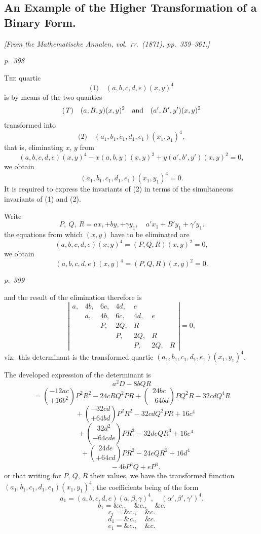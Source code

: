 \documentclass[11pt,a4paper]{article}
\theoremstyle{plain}
\theoremstyle{definition}
\begin{document}
\subsection{An Example of the Higher Transformation of a Binary Form.}

\begin{center}
\textit{[From the Mathematische Annalen, vol.~\textsc{iv}.\ (1871), pp.~359--361.]}
\end{center}

\textit{p.~398}

\noindent
\textsc{The} quartic
\[
\text{(1)}\quad (a, b, c, d, e)(x, y)^4
\]
is by means of the two quantics
\[
\text{(\textit{T})}\quad (a, B, y)(x, y)^2 \quad \text{and} \quad (a', B', y')(x, y)^2
\]
transformed into
\[
\text{(2)}\quad (a_1, b_1, c_1, d_1, e_1)(x_1, y_1)^4,
\]
that is, eliminating $x$, $y$ from
\[
(a, b, c, d, e)(x, y)^4
- x(a, b, y)(x, y)^2 + y(a', b', y')(x, y)^2 = 0,
\]
we obtain
\[
(a_1, b_1, c_1, d_1, e_1)(x_1, y_1)^4 = 0.
\]
It is required to express the invariants of (2) in terms of the simultaneous invariants
of (1) and (2).

Write
\[
P,\ Q,\ R = ax, + by, + \gamma y_1, \quad a'x_1 + B' y_1 + \gamma' y_1.
\]
the equations from which $(x, y)$ have to be eliminated are
\[
(a, b, c, d, e)(x, y)^4 = (P, Q, R)(x, y)^2 = 0,
\]
we obtain
\[
(a, b, c, d, e)(x, y)^4 = (P, Q, R)(x, y)^2 = 0.
\]

\clearpage

\bigskip
\textit{p.~399}
\smallskip

\noindent
and the result of the elimination therefore is
\[
\left|\begin{array}{cccc}
a, & 4b, & 6c, & 4d, & e \\
\, & a, & 4b, & 6c, & 4d, & e \\
\, & \, & P, & 2Q, & R \\
\, & \, & \, & P, & 2Q, & R \\
\, & \, & \, & \, & P, & 2Q, & R
\end{array}\right| = 0,
\]
viz.\ this determinant is the transformed quartic $(a_1, b_1, c_1, d_1, e_1)(x_1, y_1)^4$.

The developed expression of the determinant is
\[
a^2 D - 8 b Q R
\]
\[
= \binom{-12 a c}{+ 16 b^2} P^2 R^2 - 24 c R Q^2 P R + \binom{24 b c}{- 64 b d} P Q^2 R - 32 c d Q^4 R
\]
\[
\quad + \binom{-32 c d}{+ 64 b d} P^2 R^2 - 32 c d Q^2 P R + 16 c^4
\]
\[
\quad + \binom{32 d^2}{- 64 c d e} P R^3 - 32 d e Q R^3 + 16 e^4
\]
\[
\quad + \binom{24 d e}{+ 64 c d} P R^2 - 24 e Q R^2 + 16 d^4
\]
\[
\quad - 4 b P^3 Q + e P^3.
\]
or that writing for $P$, $Q$, $R$ their values, we have the transformed function
$(a_1, b_1, c_1, d_1, e_1)(x_1, y_1)^4$; the coefficients being of the form
\[
a_1 = (a, b, c, d, e)(a, \beta, \gamma)^4, \quad (\alpha', \beta', \gamma')^4.
\]
\[
b_1 = \&c., \quad \&c., \quad \&c.
\]
\[
c_1 = \&c., \quad \&c.
\]
\[
d_1 = \&c., \quad \&c.
\]
\[
e_1 = \&c., \quad \&c.
\]
\end{document}
